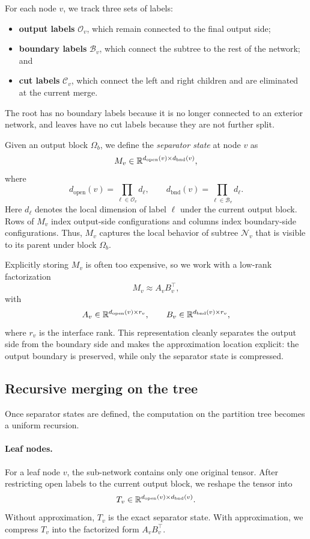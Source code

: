 For each node $v$, we track three sets of labels:
\begin{itemize}
    \item \textbf{output labels} $\mathcal O_v$, which remain connected to the final output side;
    \item \textbf{boundary labels} $\mathcal B_v$, which connect the subtree to the rest of the network; and
    \item \textbf{cut labels} $\mathcal C_v$, which connect the left and right children and are eliminated at the current merge.
\end{itemize}
The root has no boundary labels because it is no longer connected to an exterior network, and leaves have no cut labels because they are not further split.

Given an output block $\Omega_b$, we define the \emph{separator state} at node $v$ as
\[
M_v \in \mathbb{R}^{d_{\mathrm{open}}(v) \times d_{\mathrm{bnd}}(v)},
\]
where
\[
d_{\mathrm{open}}(v)=\prod_{\ell\in\mathcal O_v} d_{\ell},
\qquad
d_{\mathrm{bnd}}(v)=\prod_{\ell\in\mathcal B_v} d_{\ell}.
\]
Here $d_\ell$ denotes the local dimension of label $\ell$ under the current output block. Rows of $M_v$ index output-side configurations and columns index boundary-side configurations. Thus, $M_v$ captures the local behavior of subtree $\mathcal N_v$ that is visible to its parent under block $\Omega_b$.

Explicitly storing $M_v$ is often too expensive, so we work with a low-rank factorization
\[
M_v \approx A_v B_v^\top,
\]
with
\[
A_v \in \mathbb{R}^{d_{\mathrm{open}}(v) \times r_v},
\qquad
B_v \in \mathbb{R}^{d_{\mathrm{bnd}}(v) \times r_v},
\]
where $r_v$ is the interface rank. This representation cleanly separates the output side from the boundary side and makes the approximation location explicit: the output boundary is preserved, while only the separator state is compressed.

\subsection{Recursive merging on the tree}

Once separator states are defined, the computation on the partition tree becomes a uniform recursion.

\paragraph{Leaf nodes.}
For a leaf node $v$, the sub-network contains only one original tensor. After restricting open labels to the current output block, we reshape the tensor into
\[
T_v \in \mathbb{R}^{d_{\mathrm{open}}(v) \times d_{\mathrm{bnd}}(v)}.
\]
Without approximation, $T_v$ is the exact separator state. With approximation, we compress $T_v$ into the factorized form $A_v B_v^\top$.

